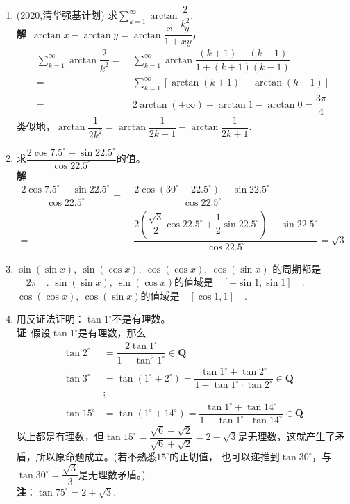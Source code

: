\begin{enumerate}[label={【\textbf{例\thechapter.\arabic*}】},
 leftmargin=\inteval{\myenumleftmargin}pt,
 itemsep=\inteval{\myenumitempsep}pt,
 itemindent=\inteval{\myenumitemindent}pt]
\item (2020,清华强基计划) 求$ \sum\limits_{k=1}^{\infty}\arctan\dfrac{2}{k^2} $. 
\\ \textbf{解}\ $ \arctan x-\arctan y=\arctan\dfrac{x-y}{1+xy} $，
\begin{align*}
    \sum_{k=1}^{\infty}\arctan\dfrac{2}{k^2} 
    =&\ \sum_{k=1}^{\infty}\arctan\dfrac{(k+1)-(k-1)}{1+(k+1)(k-1)} \\
    =&\ \sum_{k=1}^{\infty}\left[
    \arctan(k+1)-\arctan(k-1) \right]\\
    =&\ 2\arctan(+\infty)-\arctan1-\arctan0=
    \dfrac{3\pi}{4}
\end{align*}
类似地，$ \arctan\dfrac{1}{2k^2}=\arctan\dfrac{1}{2k-1}-
\arctan\dfrac{1}{2k+1} $. 

\item 求$ \dfrac{2\cos7.5^{\circ}-\sin22.5^{\circ}}{\cos 22.5^{\circ}} $的值。\\
\textbf{解}\ 
\begin{align*}
    \dfrac{2\cos7.5^{\circ}-\sin22.5^{\circ}}{\cos 22.5^{\circ}}=&\ 
    \dfrac{2\cos(30^{\circ}-22.5^{\circ})-\sin22.5^{\circ}}{\cos 22.5^{\circ}}\\ 
    =&\ \dfrac{2(\dfrac{\sqrt{3}}{2}\cos22.5^{\circ}+\dfrac{1}{2}\sin22.5^{\circ})
        -\sin22.5^{\circ}}{\cos 22.5^{\circ}} = \sqrt{3}
\end{align*} 

\item $ \sin(\sin x),\ \sin(\cos x),\ \cos(\cos x),\ \cos(\sin x) $
的周期都是\underline{$\quad 2\pi \quad $}. $ \sin(\sin x),\ 
\sin(\cos x) $的值域是\underline{$\quad [-\sin 1,\sin 1] \quad$}. 
$ \cos(\cos x),\ \cos(\sin x) $的值域是\underline{$\quad
    [\cos 1,1] \quad $}. 

\item 用反证法证明：$ \tan 1^{\circ} $不是有理数。\\
\textbf{证}\ 假设$ \tan 1^{\circ} $是有理数，那么
\begin{align*}
    \tan 2^{\circ}&=\dfrac{2\tan 1^{\circ}}{1-\tan^2 1^{\circ}} \in \textbf{Q}\\
    \tan 3^{\circ}&=\tan (1^{\circ}+2^{\circ})=\dfrac{\tan 1^{\circ}
        +\tan 2^{\circ}}{1-\tan 1^{\circ}\cdot \tan 2^{\circ}} \in \textbf{Q} \\
    &\vdots \\
    \tan 15^{\circ}&=\tan (1^{\circ}+14^{\circ})=\dfrac{\tan 1^{\circ}+
        \tan 14^{\circ}}{1-\tan 1^{\circ}\cdot \tan 14^{\circ}} \in \textbf{Q}
\end{align*}
以上都是有理数，但$ \tan 15^{\circ}=\dfrac{\sqrt{6}-\sqrt{2}}{\sqrt{6}+\sqrt{2}}
=2-\sqrt{3} $是无理数，这就产生了矛盾，所以原命题成立。(若不熟悉$ 15^{\circ} $的正切值，
也可以递推到$ \tan 30^{\circ} $，与$ \tan 30^{\circ}=\dfrac{\sqrt{3}}{3} $是无理数矛盾。)\\
\textbf{注}：$ \tan 75^{\circ}=2+\sqrt{3} $. 


\end{enumerate}
